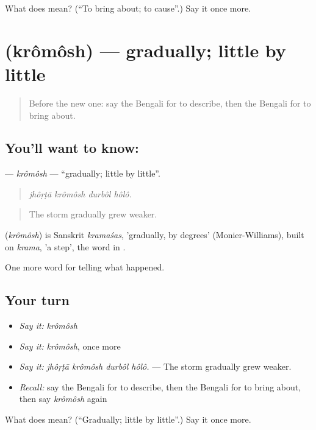 \begin{tcolorbox}[breakable,colback=teal!4,colframe=teal!35!black,title={Before you move on}]
What does  mean? (\textquotedblleft{}To bring about; to cause\textquotedblright{}.) Say it once more.
\end{tcolorbox}
\section[\texorpdfstring{\bn{ক্রমশ} (krômôsh)}{ক্রমশ (krômôsh)}]{ (krômôsh) — gradually; little by little}

\label{lesson:BN-C302-kromosh}



\begin{quote}
Before the new one: say the Bengali for to describe, then the Bengali for to bring about.
\end{quote}

\subsection*{You'll want to know: }
\textbf{} — \emph{krômôsh} — \textquotedblleft{}gradually; little by little\textquotedblright{}.

\begin{quote}
   
\end{quote}

\begin{quote}
\emph{jhôṛṭā krômôsh durbôl hôlô.}
\end{quote}

\begin{quote}
The storm gradually grew weaker.
\end{quote}

\begin{cousinweb}
\textbf{} (\emph{krômôsh}) is Sanskrit \emph{kramaśas}, 'gradually, by degrees' (Monier-Williams), built on \emph{krama}, 'a step', the word in \textbf{}.
\end{cousinweb}

\begin{grammarlens}[title={What you've built}]
One more word for telling what happened.
\end{grammarlens}

\subsection*{Your turn}
\begin{itemize}
\raggedright
  \item \emph{Say it:} \emph{krômôsh}
  \item \emph{Say it:} \emph{krômôsh}, once more
  \item \emph{Say it:} \emph{jhôṛṭā krômôsh durbôl hôlô.} — The storm gradually grew weaker.
  \item \emph{Recall:} say the Bengali for to describe, then the Bengali for to bring about, then say \emph{krômôsh} again
\end{itemize}

\begin{tcolorbox}[breakable,colback=teal!4,colframe=teal!35!black,title={Before you move on}]
What does  mean? (\textquotedblleft{}Gradually; little by little\textquotedblright{}.) Say it once more.
\end{tcolorbox}
